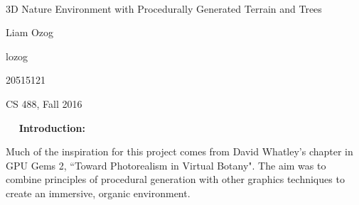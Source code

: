 \documentclass{article}
\newcommand\projecttitle{3D Nature Environment with Procedurally Generated Terrain and Trees}
\newcommand\myname{Liam Ozog}
\newcommand\myuserid{lozog}
\newcommand\mystudentid{20515121}
\newcommand\myclass{CS 488, Fall 2016}
\begin{document}
~\vfill
\begin{center}
\Large

\projecttitle

\myname

\myuserid

\mystudentid

\myclass

\end{center}
\vfill ~\vfill~
\newpage
\Large\noindent\textbf{Introduction:} \\
\normalsize

Much of the inspiration for this project comes from David Whatley's chapter in GPU Gems 2, ``Toward Photorealism in Virtual Botany". The aim was to combine principles of procedural generation with other graphics techniques to create an immersive, organic environment.
\\
\end{document}
